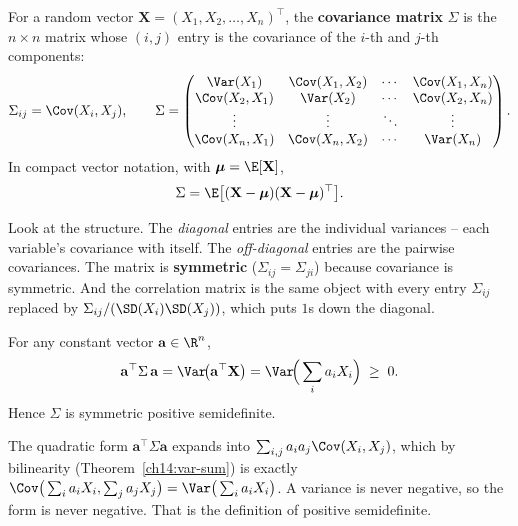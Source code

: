 \begin{definition}
\label{ch14:def-cov-matrix}
For a random vector $\mathbf{X} = (X_1, X_2, \dots, X_n)^\top$, the
\textbf{covariance matrix} $\Sigma$ is the $n \times n$ matrix whose
$(i, j)$ entry is the covariance of the $i$-th and $j$-th components:
\[
\Sigma_{ij} = \Cov(X_i, X_j),
\qquad
\Sigma =
\begin{pmatrix}
\Var(X_1) & \Cov(X_1, X_2) & \cdots & \Cov(X_1, X_n) \\
\Cov(X_2, X_1) & \Var(X_2) & \cdots & \Cov(X_2, X_n) \\
\vdots & \vdots & \ddots & \vdots \\
\Cov(X_n, X_1) & \Cov(X_n, X_2) & \cdots & \Var(X_n)
\end{pmatrix}.
\]
In compact vector notation, with $\boldsymbol\mu = \E[\mathbf{X}]$,
\[
\Sigma = \E\big[(\mathbf{X} - \boldsymbol\mu)(\mathbf{X} - \boldsymbol\mu)^\top\big].
\]
\end{definition}

Look at the structure. The \emph{diagonal} entries are the individual variances --
each variable's covariance with itself. The \emph{off-diagonal} entries are the
pairwise covariances. The matrix is \textbf{symmetric} ($\Sigma_{ij} =
\Sigma_{ji}$) because covariance is symmetric. And the correlation matrix is the same
object with every entry $\Sigma_{ij}$ replaced by $\Sigma_{ij}/(\SD(X_i)\SD(X_j))$,
which puts $1$s down the diagonal.

\begin{proposition}
\label{ch14:psd}
For any constant vector $\mathbf{a} \in \R^n$,
\[
\mathbf{a}^\top \Sigma\, \mathbf{a} = \Var\!\big(\mathbf{a}^\top \mathbf{X}\big)
= \Var\!\Big(\sum_i a_i X_i\Big) \;\ge\; 0.
\]
Hence $\Sigma$ is symmetric positive semidefinite.
\end{proposition}

\begin{whybox}
The quadratic form $\mathbf{a}^\top \Sigma \mathbf{a}$ expands into
$\sum_{i,j} a_i a_j \Cov(X_i, X_j)$, which by bilinearity
(Theorem~\ref{ch14:var-sum}) is exactly $\Cov\big(\sum_i a_i X_i, \sum_j a_j
X_j\big) = \Var\big(\sum_i a_i X_i\big)$. A variance is never negative, so the form
is never negative. That is the definition of positive semidefinite.
\end{whybox}

